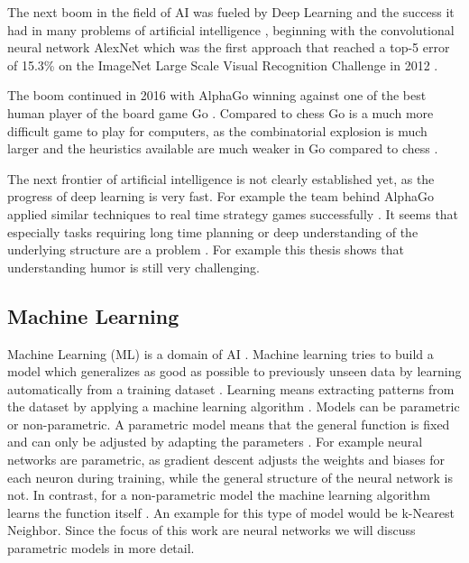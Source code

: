 \documentclass[draft,final,oneside]{vutinfth} %
\begin{document}
The next boom in the field of AI was fueled by Deep Learning and the success it had in many problems of artificial intelligence \cite{selfdriving}\cite{nmt}\cite{speech}, beginning with the convolutional neural network AlexNet which was the first approach that reached a top-5 error of 15.3\% on the ImageNet Large Scale Visual Recognition Challenge in 2012  \cite{alexnet}.

The boom continued in 2016 with AlphaGo winning against one of the best human player of the board game Go \cite{alphagopaper}. Compared to chess Go is a much more difficult game to play for computers, as the combinatorial explosion is much larger and the heuristics available are much weaker in Go compared to chess \cite{alphagopaper}.

The next frontier of artificial intelligence is not clearly established yet, as the progress of deep learning is very fast. For example the team behind AlphaGo applied similar techniques to real time strategy games successfully \cite{arulkumaran2019alphastar}. It seems that especially tasks requiring long time planning or deep understanding of the underlying structure are a problem \cite{atariplaying}. For example this thesis shows that understanding humor is still very challenging.


\subsection{Machine Learning}

Machine Learning (ML) is a domain of AI \cite{aimodern}. Machine learning tries to build a model which generalizes as good as possible to previously unseen data by learning automatically from a training dataset \cite{bishop}. Learning means extracting patterns from the dataset by applying a machine learning algorithm \cite{bishop}. Models can be parametric or non-parametric. A parametric model means that the general function is fixed and can only be adjusted by adapting the parameters \cite{aimodern}. For example neural networks are parametric, as gradient descent adjusts the weights and biases for each neuron during training, while the general structure of the neural network is not. In contrast, for a non-parametric model the machine learning algorithm learns the function itself \cite{aimodern}. An example for this type of model would be k-Nearest Neighbor.  Since the focus of this work are neural networks we will discuss parametric models in more detail.
\end{document}
